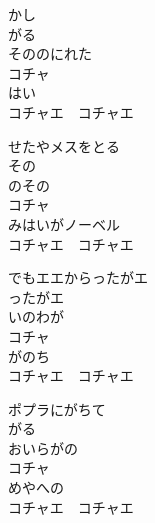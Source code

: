 \documentclass[10pt,b5j]{tarticle} %
\begin{document}
\vspace{1.5em} %
\newcommand{\linespace}{0.5em} %
\newcommand{\blocksize}{0.5\hsize} %
\begin{enumerate} %
    \begin{minipage}[c]{\blocksize}
    
        \vspace{\linespace}
        \item
        かし\\
        がる\\
        そののにれた\\
        コチャ\\
        はい\\
        コチャエ　コチャエ
        
        \vspace{\linespace}
        \item
        せたやメスをとる\\
        その\\
        のその\\
        コチャ\\
        みはいがノーベル\\
        コチャエ　コチャエ
        
        \vspace{\linespace}
        \item
        でもエエからったがエ\\
        ったがエ\\
        いのわが\\
        コチャ\\
        がのち\\
        コチャエ　コチャエ
        
        \vspace{\linespace}
        \item
        ポプラにがちて\\
        がる\\
        おいらがの\\
        コチャ\\
        めやへの\\
        コチャエ　コチャエ
    
    \end{minipage}
\end{enumerate} %
\end{document}
